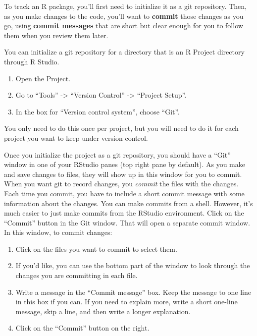 \documentclass[]{tufte-book}
\providecommand{\tightlist}{%
  \setlength{\itemsep}{0pt}\setlength{\parskip}{0pt}}
\begin{document}
To track an R package, you'll first need to initialize it as a git repository.
Then, as you make changes to the code, you'll want to \textbf{commit} those changes
as you go, using \textbf{commit messages} that are short but clear enough for you to
follow them when you review them later.

You can initialize a git repository for a directory that is an R Project
directory through R Studio.

\begin{enumerate}
\def\labelenumi{\arabic{enumi}.}
\tightlist
\item
  Open the Project.
\item
  Go to ``Tools'' -\textgreater{} ``Version Control'' -\textgreater{} ``Project Setup''.
\item
  In the box for ``Version control system'', choose ``Git''.
\end{enumerate}

You only need to do this once per project, but you will need to do it for each
project you want to keep under version control.

Once you initialize the project as a git repository, you should have a ``Git''
window in one of your RStudio panes (top right pane by default). As you make and
save changes to files, they will show up in this window for you to commit. When
you want git to record changes, you \emph{commit} the files with the changes. Each
time you commit, you have to include a short commit message with some
information about the changes. You can make commits from a shell. However, it's
much easier to just make commits from the RStudio environment. Click on the
``Commit'' button in the Git window. That will open a separate commit window. In
this window, to commit changes:

\begin{enumerate}
\def\labelenumi{\arabic{enumi}.}
\tightlist
\item
  Click on the files you want to commit to select them.
\item
  If you'd like, you can use the bottom part of the window to look through the
  changes you are committing in each file.
\item
  Write a message in the ``Commit message'' box. Keep the message to one line in
  this box if you can. If you need to explain more, write a short one-line
  message, skip a line, and then write a longer explanation.
\item
  Click on the ``Commit'' button on the right.
\end{enumerate}
\end{document}
